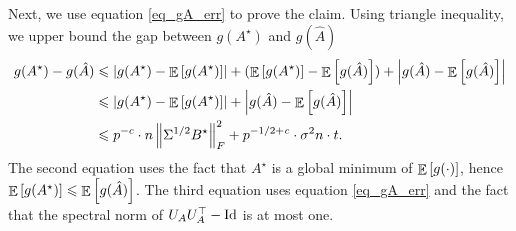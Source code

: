 	\bigskip
	Next, we use equation \eqref{eq_gA_err} to prove the claim.
	Using triangle inequality, we upper bound the gap between $g(A^{\star})$ and $g(\hat{A})$
	\begin{align}
		g(A^{\star}) - g(\hat{A}) &\leqslant {\left| {g(A^{\star}) - \mathop{\mathbb{E}}\left[ g(A^{\star}) \right]} \right|} + (\mathop{\mathbb{E}}\left[ g(A^{\star}) \right] - \mathop{\mathbb{E}}\left[ g(\hat{A}) \right]) + {\left| {g(\hat{A}) - \mathop{\mathbb{E}}\left[ g(\hat{A}) \right]} \right|} \nonumber \\
		&\leqslant {\left| {g(A^{\star}) - \mathop{\mathbb{E}}\left[ g(A^{\star}) \right]} \right|} +{\left| {g(\hat{A}) - \mathop{\mathbb{E}}\left[ g(\hat{A}) \right]} \right|} \nonumber \\
		&\leqslant p^{-c} \cdot n \left\| \Sigma^{1/2} B^{\star} \right\|_{F}^2 + p^{-1/2 + {\mathit{c}}}\cdot \sigma^2 n \cdot t. \label{eq_g_gap}
	\end{align}
	The second equation uses the fact that $A^{\star}$ is a global minimum of $\mathop{\mathbb{E}}\left[ g(\cdot) \right]$, hence $\mathop{\mathbb{E}}\left[ g(A^{\star}) \right] \leqslant \mathop{\mathbb{E}}\left[ g(\hat{A}) \right]$.
	The third equation uses equation \eqref{eq_gA_err} and the fact that the spectral norm of $U_A U_A^{\top} - \operatorname{Id}$ is at most one.

